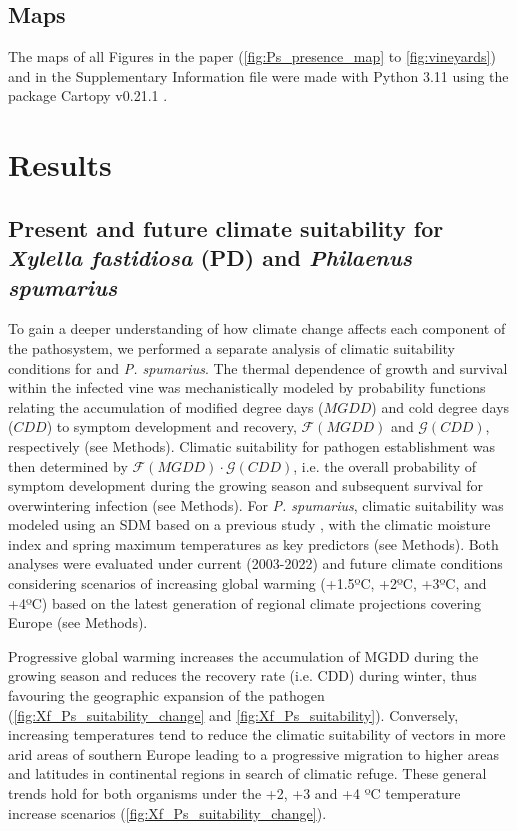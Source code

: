 \subsection{Maps}

The maps of all Figures in the paper (\cref{fig:Ps_presence_map} to
\cref{fig:vineyards}) and in the Supplementary Information file were made with
Python 3.11 \cite{Python} using the package Cartopy v0.21.1 \cite{Cartopy,
    Cartopy_zenodo}.

\section{Results}

\subsection{Present and future climate suitability for \textit{Xylella
        fastidiosa} (PD) and \textit{Philaenus spumarius}}

To gain a deeper understanding of how climate change affects each component
of the pathosystem, we performed a separate analysis of climatic suitability
conditions for \xf{} and \textit{P. spumarius}. The thermal dependence of \xf{}
growth and survival within the infected vine was mechanistically modeled by
probability functions relating the accumulation of modified degree days
($MGDD$) and cold degree days ($CDD$) to symptom development and recovery,
$\mathcal{F}(MGDD)$ and $\mathcal{G}(CDD)$, respectively (see Methods).
Climatic suitability for pathogen establishment was then determined by
$\mathcal{F}(MGDD)\cdot\mathcal{G}(CDD)$, i.e. the overall probability of
symptom development during the growing season and subsequent survival for
overwintering infection (see Methods).	For \textit{P. spumarius}, climatic
suitability was modeled using an SDM based on a previous study
\cite{Godefroid2022_vector}, with the climatic moisture index
\cite{willmott_more_1992} and spring maximum temperatures  as key predictors
(see Methods). Both analyses were evaluated under current (2003-2022) and
future climate conditions considering scenarios of increasing global warming
(+1.5ºC, +2ºC, +3ºC, and +4ºC) based on the latest generation of regional
climate projections covering Europe \cite{jacob_regional_2020} (see Methods).

Progressive global warming increases the accumulation of MGDD during the
growing season and reduces the recovery rate (i.e. CDD) during winter, thus
favouring the geographic expansion of the pathogen
(\cref{fig:Xf_Ps_suitability_change} and \cref{fig:Xf_Ps_suitability}).
Conversely, increasing temperatures tend to reduce the climatic suitability of
vectors in more arid areas of southern Europe leading to a progressive
migration to higher areas and latitudes in continental regions in search of
climatic refuge. These general trends hold for both organisms under the +2, +3
and +4 ºC temperature increase scenarios
(\cref{fig:Xf_Ps_suitability_change}).

